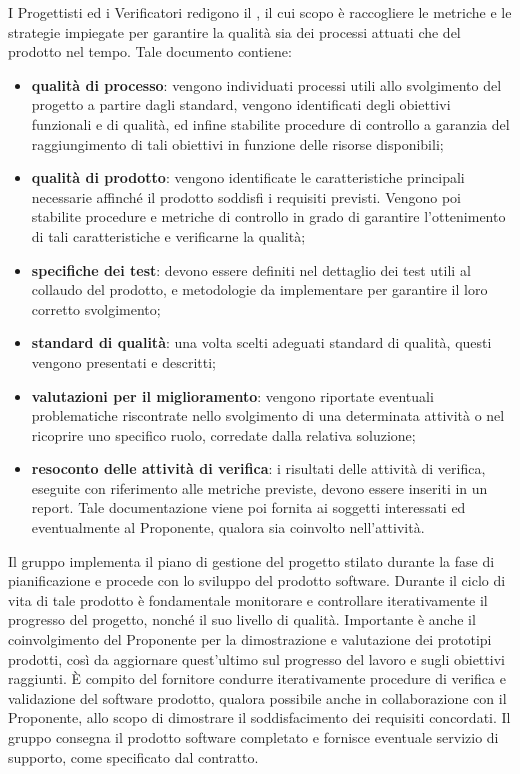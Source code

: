     I Progettisti ed i Verificatori redigono il \PdQ{}, il cui scopo è raccogliere le metriche e le strategie impiegate per garantire la qualità sia dei processi attuati che del prodotto nel tempo. Tale documento contiene:
    \begin{itemize}
       		\item{\textbf{qualità di processo}: vengono individuati processi utili allo svolgimento del progetto a partire dagli standard, vengono identificati degli obiettivi funzionali e di qualità, ed infine stabilite procedure di controllo a garanzia del raggiungimento di tali obiettivi in funzione delle risorse disponibili;}
       		\item{\textbf{qualità di prodotto}: vengono identificate le caratteristiche principali necessarie affinché il prodotto soddisfi i requisiti previsti. Vengono poi stabilite procedure e metriche di controllo in grado di garantire l'ottenimento di tali caratteristiche e verificarne la qualità;}
       		\item{\textbf{specifiche dei test}: devono essere definiti nel dettaglio dei test utili al collaudo del prodotto, e metodologie da implementare per garantire il loro corretto svolgimento;}
       		\item{\textbf{standard di qualità}: una volta scelti adeguati standard di qualità, questi vengono presentati e descritti;}
       		\item{\textbf{valutazioni per il miglioramento}: vengono riportate eventuali problematiche riscontrate nello svolgimento di una determinata attività o nel ricoprire uno specifico ruolo, corredate dalla relativa soluzione;}
       		\item{\textbf{resoconto delle attività di verifica}: i risultati delle attività di verifica, eseguite con riferimento alle metriche previste, devono essere inseriti in un report. Tale documentazione viene poi fornita ai soggetti interessati ed eventualmente al Proponente, qualora sia coinvolto nell'attività.}
    \end{itemize}
    Il gruppo implementa il piano di gestione del progetto stilato durante la fase di pianificazione e procede con lo sviluppo del prodotto software. Durante il ciclo di vita di tale prodotto è fondamentale monitorare e controllare iterativamente il progresso del progetto, nonché il suo livello di qualità. Importante è anche il coinvolgimento del Proponente per la dimostrazione e valutazione dei prototipi prodotti, così da aggiornare quest'ultimo sul progresso del lavoro e sugli obiettivi raggiunti.
    È compito del fornitore condurre iterativamente procedure di verifica e validazione del software prodotto, qualora possibile anche in collaborazione con il Proponente, allo scopo di dimostrare il soddisfacimento dei requisiti concordati.
    Il gruppo consegna il prodotto software completato e fornisce eventuale servizio di supporto, come specificato dal contratto.
